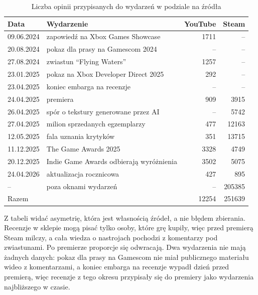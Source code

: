 \begin{table}[hbp]
  \caption{Liczba opinii przypisanych do wydarzeń w podziale na źródła}
  \label{tab:event-coverage}
  \centering
  \small
  \begin{tabular}{|l|l|r|r|}
    \hline
    Data       & Wydarzenie                                  & YouTube       & Steam          \\
    \hline
    09.06.2024 & zapowiedź na Xbox Games Showcase            & \num{1711}    & --             \\
    20.08.2024 & pokaz dla prasy na Gamescom 2024            & --            & --             \\
    27.08.2024 & zwiastun \enquote{Flying Waters}            & \num{1257}    & --             \\
    23.01.2025 & pokaz na Xbox Developer Direct 2025         & \num{292}     & --             \\
    23.04.2025 & koniec embarga na recenzje                  & --            & --             \\
    24.04.2025 & premiera                                    & \num{909}     & \num{3915}     \\
    26.04.2025 & spór o tekstury generowane przez AI         & --            & \num{5742}     \\
    27.04.2025 & milion sprzedanych egzemplarzy              & \num{477}     & \num{12163}    \\
    12.05.2025 & fala uznania krytyków                       & \num{351}     & \num{13715}    \\
    11.12.2025 & The Game Awards 2025                        & \num{3328}    & \num{4749}     \\
    20.12.2025 & Indie Game Awards odbierają wyróżnienia     & \num{3502}    & \num{5075}     \\
    24.04.2026 & aktualizacja rocznicowa                     & \num{427}     & \num{895}      \\
    \hline
    --         & poza oknami wydarzeń                        & --            & \num{205385}   \\
    \hline
    \multicolumn{2}{|l|}{Razem}                              & \num{12254}   & \num{251639}   \\
    \hline
  \end{tabular}
\end{table}

Z tabeli widać asymetrię, która jest własnością źródeł, a nie błędem zbierania.
Recenzje w sklepie mogą pisać tylko osoby, które grę kupiły, więc przed premierą Steam milczy, a cała wiedza o nastrojach pochodzi z komentarzy pod zwiastunami.
Po premierze proporcje się odwracają.
Dwa wydarzenia nie mają żadnych danych: pokaz dla prasy na Gamescom nie miał publicznego materiału wideo z komentarzami, a koniec embarga na recenzje wypadł dzień przed premierą, więc recenzje z tego okresu przypisały się do premiery jako wydarzenia najbliższego w czasie.

